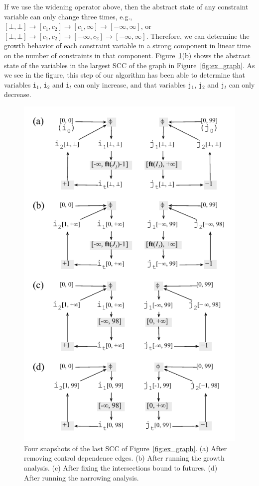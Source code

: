 \documentclass[preprint]{sigplanconf}[10pt]
\begin{document}
If we use the widening operator above, then the abstract state of any constraint
variable can only change three times, e.g., $[\bot, \bot] \rightarrow [c_1, c_2]
\rightarrow [c_1, \infty] \rightarrow [-\infty, \infty]$, or
$[\bot, \bot] \rightarrow [c_1, c_2] \rightarrow [-\infty, c_2]
\rightarrow [-\infty, \infty]$.
Therefore, we can determine the growth behavior of each constraint variable in
a strong component in linear time on the number of constraints in that
component.
Figure~\ref{fig:ex_partition_grow_crop}(b) shows the abstract state of the
variables in the largest SCC of the graph in Figure~\ref{fig:ex_graph}.
As we see in the figure, this step of our algorithm has been able to determine
that variables \texttt{i}$_1$, \texttt{i}$_2$ and \texttt{i}$_t$ can only
increase, and that variables \texttt{j}$_1$, \texttt{j}$_2$ and \texttt{j}$_t$
can only decrease.

\begin{figure}[t!]
\begin{center}
\includegraphics[width=0.9\columnwidth]{images/ex_partition_grow_crop}
\end{center}
\caption{\label{fig:ex_partition_grow_crop}
Four snapshots of the last SCC of Figure~\ref{fig:ex_graph}.
(a) After removing control dependence edges.
(b) After running the growth analysis.
(c) After fixing the intersections bound to futures.
(d) After running the narrowing analysis.}
\end{figure}
\end{document}
